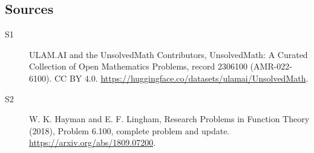 \documentclass[11pt]{article}
\begin{document}
\subsection{Sources}
\begin{description}
\item[\hypertarget{source:2306100:1}{S1}] ULAM.AI and the UnsolvedMath Contributors, UnsolvedMath: A Curated Collection of Open Mathematics Problems, record 2306100 (AMR-022-6100). CC BY 4.0. \url{https://huggingface.co/datasets/ulamai/UnsolvedMath}.
\item[\hypertarget{source:2306100:2}{S2}] W. K. Hayman and E. F. Lingham, Research Problems in Function Theory (2018), Problem 6.100, complete problem and update. \url{https://arxiv.org/abs/1809.07200}.
\end{description}
\label{end:2306100}
\end{document}
